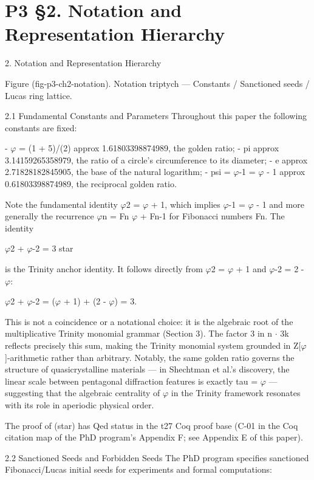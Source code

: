 
\section{P3 §2. Notation and Representation Hierarchy}

2. Notation and Representation Hierarchy

         Figure (fig-p3-ch2-notation). Notation triptych --- Constants / Sanctioned seeds / Lucas ring
                                                    lattice.

  2.1 Fundamental Constants and Parameters
  Throughout this paper the following constants are fixed:

  - $\varphi$ = (1 + 5)/(2) approx 1.61803398874989, the golden ratio;
  - pi approx 3.14159265358979, the ratio of a circle's circumference to its diameter;
  - e approx 2.71828182845905, the base of the natural logarithm;
  - psi = $\varphi$-1 = $\varphi$ - 1 approx 0.61803398874989, the reciprocal golden ratio.

  Note the fundamental identity $\varphi$2 = $\varphi$ + 1, which implies $\varphi$-1 = $\varphi$ - 1 and more generally
  the recurrence $\varphi$n = Fn $\varphi$ + Fn-1 for Fibonacci numbers Fn. The identity

  $\varphi$2 + $\varphi$-2 = 3 star

  is the Trinity anchor identity. It follows directly from $\varphi$2 = $\varphi$ + 1 and $\varphi$-2 = 2 - $\varphi$:

  $\varphi$2 + $\varphi$-2 = ($\varphi$ + 1) + (2 - $\varphi$) = 3.

  This is not a coincidence or a notational choice: it is the algebraic root of the
  multiplicative Trinity monomial grammar (Section 3). The factor 3 in n $\cdot$ 3k reflects
  precisely this sum, making the Trinity monomial system grounded in Z[$\varphi$]-arithmetic
  rather than arbitrary. Notably, the same golden ratio governs the structure of
  quasicrystalline materials --- in Shechtman et al.'s discovery, the linear scale between
  pentagonal diffraction features is exactly tau = $\varphi$ --- suggesting that the algebraic
  centrality of $\varphi$ in the Trinity framework resonates with its role in aperiodic physical
  order.

  The proof of (star) has Qed status in the t27 Coq proof base (C-01 in the Coq citation
  map of the PhD program's Appendix F; see Appendix E of this paper).

  2.2 Sanctioned Seeds and Forbidden Seeds
  The PhD program specifies sanctioned Fibonacci/Lucas initial seeds for experiments
  and formal computations:

